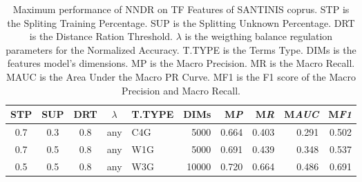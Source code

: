 \begin{table}
\center
\begin{tabular}{cccclrrrrr}
\hline
STP & SUP & DRT & $\lambda$ & T.TYPE & DIMs & M\emph{P} & M\emph{R} & M\emph{AUC} & M\emph{F1} \\
\hline
0.7 & 0.3 & 0.8 & any & C4G & 5000 & 0.664 & 0.403 & 0.291 & 0.502 \\
0.7 & 0.5 & 0.8 & any & W1G & 5000 & 0.691 & 0.439 & 0.348 & 0.537 \\
0.5 & 0.5 & 0.8 & any & W3G & 10000 & 0.720 & 0.664 & 0.486 & 0.691 \\
\hline
\end{tabular}
\caption {Maximum performance of NNDR on TF Features of SANTINIS coprus. STP is the Spliting Training Percentage. SUP is the Splitting Unknown Percentage. DRT is the Distance Ration Threshold. $\lambda$ is the weigthing balance regulation parameters for the Normalized Accuracy. T.TYPE is the Terms Type. DIMs is the features model's dimensions. MP is the Macro Precision. MR is the Macro Recall. MAUC is the Area Under the Macro PR Curve. MF1 is the F1 score of the Macro Precision and Macro Recall.}
\label{chap:word_embeddings:tbl:NNDR_TF}
\end{table}


